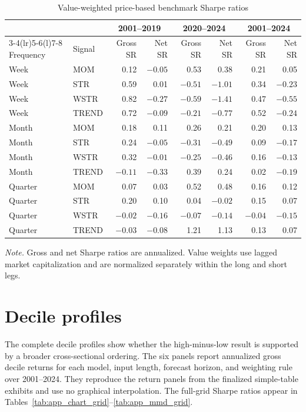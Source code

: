 \begin{table}[htbp]
\centering
\caption{Value-weighted price-based benchmark Sharpe ratios}
\label{tab:app_benchmark_vw}
\scriptsize
\setlength{\tabcolsep}{4.6pt}
\begin{tabular}{@{}llrrrrrr@{}}
\toprule
& & \multicolumn{2}{c}{2001--2019} & \multicolumn{2}{c}{2020--2024} & \multicolumn{2}{c}{2001--2024} \\
\cmidrule(lr){3-4}\cmidrule(lr){5-6}\cmidrule(l){7-8}
Frequency & Signal & Gross SR & Net SR & Gross SR & Net SR & Gross SR & Net SR \\
\midrule
Week & MOM   & 0.12 & $-0.05$ & 0.53 & 0.38 & 0.21 & 0.05 \\
Week & STR   & 0.59 & 0.01 & $-0.51$ & $-1.01$ & 0.34 & $-0.23$ \\
Week & WSTR  & 0.82 & $-0.27$ & $-0.59$ & $-1.41$ & 0.47 & $-0.55$ \\
Week & TREND & 0.72 & $-0.09$ & $-0.21$ & $-0.77$ & 0.52 & $-0.24$ \\
\addlinespace[2pt]
Month & MOM   & 0.18 & 0.11 & 0.26 & 0.21 & 0.20 & 0.13 \\
Month & STR   & 0.24 & $-0.05$ & $-0.31$ & $-0.49$ & 0.09 & $-0.17$ \\
Month & WSTR  & 0.32 & $-0.01$ & $-0.25$ & $-0.46$ & 0.16 & $-0.13$ \\
Month & TREND & $-0.11$ & $-0.33$ & 0.39 & 0.24 & 0.02 & $-0.19$ \\
\addlinespace[2pt]
Quarter & MOM   & 0.07 & 0.03 & 0.52 & 0.48 & 0.16 & 0.12 \\
Quarter & STR   & 0.20 & 0.10 & 0.04 & $-0.02$ & 0.15 & 0.07 \\
Quarter & WSTR  & $-0.02$ & $-0.16$ & $-0.07$ & $-0.14$ & $-0.04$ & $-0.15$ \\
Quarter & TREND & $-0.03$ & $-0.08$ & 1.21 & 1.13 & 0.13 & 0.07 \\
\bottomrule
\end{tabular}
\begin{minipage}{\textwidth}
\footnotesize\textit{Note.} Gross and net Sharpe ratios are annualized. Value weights use lagged market capitalization and are normalized separately within the long and short legs.
\end{minipage}
\end{table}

\FloatBarrier

\section{Decile profiles}\label{app:decile_profiles}

The complete decile profiles show whether the high-minus-low result is supported by a broader cross-sectional ordering. The six panels report annualized gross decile returns for each model, input length, forecast horizon, and weighting rule over 2001--2024. They reproduce the return panels from the finalized simple-table exhibits and use no graphical interpolation. The full-grid Sharpe ratios appear in Tables~\ref{tab:app_chart_grid}--\ref{tab:app_mmd_grid}.



\FloatBarrier
